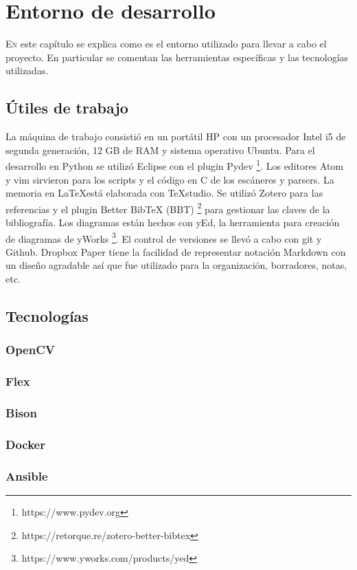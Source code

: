
\chapter{Entorno de desarrollo}
\label{chap:entorno-desarrollo}

\lettrine{E}n este capítulo se explica como es el entorno utilizado para llevar a cabo el proyecto. En particular se comentan las herramientas específicas y las tecnologías utilizadas.

\section{Útiles de trabajo}

La máquina de trabajo consistió en un portátil HP con un procesador Intel i5 de segunda generación, 12 GB de RAM y sistema operativo Ubuntu. Para el desarrollo en Python se utilizó Eclipse con el plugin Pydev
\footnote{https://www.pydev.org}. Los editores Atom y vim sirvieron para los scripts y el código en C de los escáneres y parsers. La memoria en \LaTeX está elaborada con TeXstudio. Se utilizó Zotero para las referencias y el plugin Better BibTeX (BBT) 
\footnote{https://retorque.re/zotero-better-bibtex} para gestionar las claves de la bibliografía. Los diagramas están hechos con yEd, la herramienta para creación de diagramas de yWorks 
\footnote{https://www.yworks.com/products/yed}. El control de versiones se llevó a cabo con git y Github. Dropbox Paper tiene la facilidad de representar notación Markdown con un diseño agradable así que fue utilizado para la organización, borradores, notas, etc.

\section{Tecnologías}

\subsection{OpenCV}

\subsection{Flex}

\subsection{Bison}

\subsection{Docker}

\subsection{Ansible}

